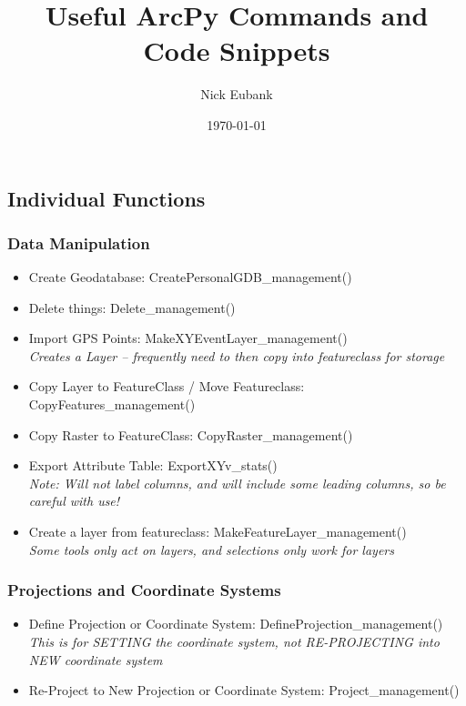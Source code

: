 \documentclass[12pt]{article}
\title{Useful ArcPy Commands and Code Snippets}
\author{Nick Eubank}
\date{\today}
\begin{document}
 
\maketitle

\subsection*{Individual Functions}

\subsubsection*{Data Manipulation}
\begin{itemize}
	\item Create Geodatabase: CreatePersonalGDB\_management() 
	\item Delete things: Delete\_management()
	\item Import GPS Points: MakeXYEventLayer\_management() \\
	\emph{Creates a Layer -- frequently need to then copy into featureclass for storage}
	\item Copy Layer to FeatureClass / Move Featureclass: CopyFeatures\_management()
	\item Copy Raster to FeatureClass: CopyRaster\_management()
	\item Export Attribute Table:  ExportXYv\_stats() \\
	\emph{Note: Will not label columns, and will include some leading columns, so be careful with use!} 
	\item Create a layer from featureclass: MakeFeatureLayer\_management()	\\
	\emph{Some tools only act on layers, and selections only work for layers}
\end{itemize}

\subsubsection*{Projections and Coordinate Systems}
\begin{itemize}
	\item Define Projection or Coordinate System: DefineProjection\_management() \\
	\emph{This is for SETTING the coordinate system, not RE-PROJECTING into NEW coordinate system}
	\item Re-Project to New Projection or Coordinate System: Project\_management()
\end{itemize}
\end{document}
